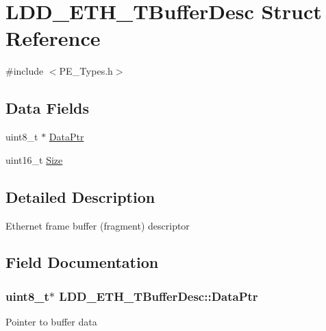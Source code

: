 \hypertarget{struct_l_d_d___e_t_h___t_buffer_desc}{}\section{L\+D\+D\+\_\+\+E\+T\+H\+\_\+\+T\+Buffer\+Desc Struct Reference}
\label{struct_l_d_d___e_t_h___t_buffer_desc}


{\ttfamily \#include $<$P\+E\+\_\+\+Types.\+h$>$}

\subsection*{Data Fields}
\begin{DoxyCompactItemize}
\item 
uint8\+\_\+t $\ast$ \hyperlink{struct_l_d_d___e_t_h___t_buffer_desc_af9049f0d40faa480a4de3532a1de4605}{Data\+Ptr}
\item 
uint16\+\_\+t \hyperlink{struct_l_d_d___e_t_h___t_buffer_desc_abddc4273b732d3cf44ff0b6870d6b87a}{Size}
\end{DoxyCompactItemize}


\subsection{Detailed Description}
Ethernet frame buffer (fragment) descriptor 

\subsection{Field Documentation}
\hypertarget{struct_l_d_d___e_t_h___t_buffer_desc_af9049f0d40faa480a4de3532a1de4605}{}
\subsubsection[{Data\+Ptr}]{\setlength{\rightskip}{0pt plus 5cm}uint8\+\_\+t$\ast$ L\+D\+D\+\_\+\+E\+T\+H\+\_\+\+T\+Buffer\+Desc\+::\+Data\+Ptr}\label{struct_l_d_d___e_t_h___t_buffer_desc_af9049f0d40faa480a4de3532a1de4605}
Pointer to buffer data \hypertarget{struct_l_d_d___e_t_h___t_buffer_desc_abddc4273b732d3cf44ff0b6870d6b87a}{}
